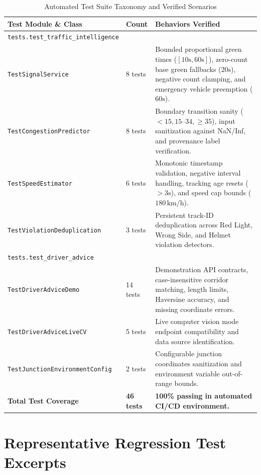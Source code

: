 \documentclass[11pt,a4paper,oneside]{report}
\begin{document}
\begin{table}[h!]
\centering
\small
\begin{tabularx}{\textwidth}{p{4.5cm} p{2cm} X}
\toprule
\textbf{Test Module \& Class} & \textbf{Count} & \textbf{Behaviors Verified} \\
\midrule
\texttt{tests.test\_traffic\_intelligence} & & \\
\quad \texttt{TestSignalService} & 8 tests & Bounded proportional green times ($[10\text{s}, 60\text{s}]$), zero-count base green fallbacks ($20\text{s}$), negative count clamping, and emergency vehicle preemption ($60\text{s}$). \\
\quad \texttt{TestCongestionPredictor} & 8 tests & Boundary transition sanity ($<15, 15\text{--}34, \ge 35$), input sanitization against NaN/Inf, and provenance label verification. \\
\quad \texttt{TestSpeedEstimator} & 6 tests & Monotonic timestamp validation, negative interval handling, tracking age resets ($>3\text{s}$), and speed cap bounds ($180\,\text{km/h}$). \\
\quad \texttt{TestViolationDeduplication} & 3 tests & Persistent track-ID deduplication across Red Light, Wrong Side, and Helmet violation detectors. \\
\midrule
\texttt{tests.test\_driver\_advice} & & \\
\quad \texttt{TestDriverAdviceDemo} & 14 tests & Demonstration API contracts, case-insensitive corridor matching, length limits, Haversine accuracy, and missing coordinate errors. \\
\quad \texttt{TestDriverAdviceLiveCV} & 5 tests & Live computer vision mode endpoint compatibility and data source identification. \\
\quad \texttt{TestJunctionEnvironmentConfig} & 2 tests & Configurable junction coordinates sanitization and environment variable out-of-range bounds. \\
\midrule
\textbf{Total Test Coverage} & \textbf{46 tests} & \textbf{100\% passing in automated CI/CD environment.} \\
\bottomrule
\end{tabularx}
\caption{Automated Test Suite Taxonomy and Verified Scenarios}
\label{tab:test_taxonomy}
\end{table}

\section{Representative Regression Test Excerpts}
\end{document}
